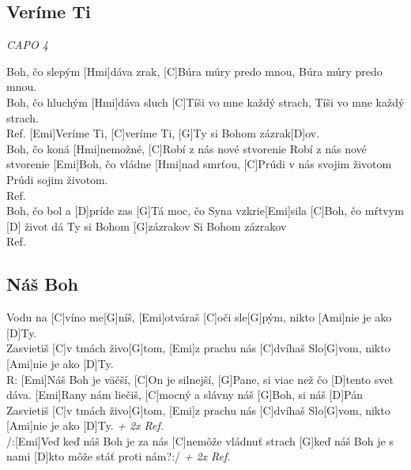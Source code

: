 \documentclass[10pt]{article}
\begin{document}
\begin{Large}
\begin{minipage}{\textwidth}
\subsection{Veríme Ti}
\textit{CAPO 4}
\begin{multicols}{2}
\begin{guitar}
	[Emi]Boh, čo slepým [Hmi]dáva zrak,
	[C]Búra múry predo mnou,
	Búra múry predo mnou.
	\\
	[Emi]Boh, čo hluchým [Hmi]dáva sluch
	[C]Tíši vo mne každý strach,
	Tíši vo mne každý strach.
	\\
	Ref. [Emi]Veríme Ti, [C]veríme Ti,
	[G]Ty si Bohom zázrak[D]ov.
	\\
	[Emi]Boh, čo koná [Hmi]nemožné,
	[C]Robí z nás nové stvorenie
	Robí z nás nové stvorenie
	[Emi]Boh, čo vládne [Hmi]nad smrťou,
	[C]Prúdi v nás svojim životom
	Prúdi sojim životom.
	\\
	Ref.
	\\
	[G]Boh, čo bol a [D]príde zas
	[G]Tá moc, čo Syna vzkrie[Emi]sila
	[C]Boh, čo mŕtvym [D] život dá
	Ty si Bohom [G]zázrakov
	Si Bohom zázrakov
	\\
	Ref.
\end{guitar}
\end{multicols}
\end{minipage}

\begin{minipage}{\textwidth}
\subsection{Náš Boh}
\begin{multicols}{2}
\begin{guitar}
	[Emi]Vodu na [C]víno me[G]níš,
	[Emi]otváraš [C]oči sle[G]pým,
	nikto [Ami]nie je ako [D]Ty.
	\\
	[Emi]Zasvietiš [C]v tmách živo[G]tom,
	[Emi]z prachu nás [C]dvíhaš Slo[G]vom,
	nikto [Ami]nie je ako [D]Ty.
	\\
	R: [Emi]Náš Boh je väčší, [C]On je silnejší,
	[G]Pane, si viac než čo [D]tento svet dáva.
	[Emi]Rany nám liečiš, [C]mocný a slávny
	náš [G]Boh, si náš [D]Pán
	\columnbreak
	[Emi]Zasvietiš [C]v tmách živo[G]tom,
	[Emi]z prachu nás [C]dvíhaš Slo[G]vom,
	nikto [Ami]nie je ako [D]Ty. \textit{+ 2x Ref.}
	\\
	/:[Emi]Veď keď náš Boh je za nás
	[C]nemôže vládnuť strach
	[G]keď náš Boh je s nami
	[D]kto môže stáť proti nám?:/ \textit{+ 2x Ref.}
\end{guitar}
\end{multicols}
\end{minipage}


\end{Large}
\end{document}

